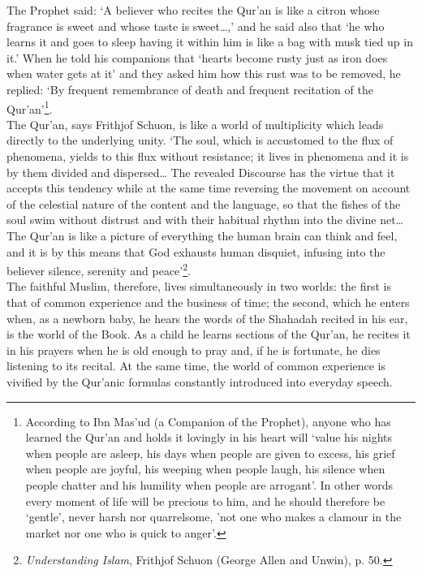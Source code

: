 \documentclass[10pt, twoside]{book}
\begin{document}
The Prophet said: `A believer who recites the Qur'an is like a citron whose fragrance is sweet and 
whose taste is sweet\ldots{},' and he said also that `he who learns it and goes to sleep having it within 
him is like a bag with musk tied up in it.' When he told his companions that `hearts become rusty 
just as iron does when water gets at it' and they asked him how this rust was to be removed, he 
replied: `By frequent remembrance of death and frequent recitation of the Qur'an'\footnote{According to Ibn Mas'ud (a Companion of the Prophet), anyone who has learned the Qur'an and holds 
it lovingly in his heart will `value his nights when people are asleep, his days when people are 
given to excess, his grief when people are joyful, his weeping when people laugh, his silence when 
people chatter and his humility when people are arrogant'. In other words every moment of life will 
be precious to him, and he should therefore be `gentle', never harsh nor quarrelsome, 'not one who 
makes a clamour in the market nor one who is quick to anger'.}.\\

The Qur'an, says Frithjof Schuon, is like a world of multiplicity which leads directly to the 
underlying unity. `The soul, which is accustomed to the flux of phenomena, yields to this flux 
without resistance; it lives in phenomena and it is by them divided and dispersed\ldots{} The revealed 
Discourse has the virtue that it accepts this tendency while at the same time reversing the movement 
on account of the celestial nature of the content and the language, so that the fishes of the soul 
swim without distrust and with their habitual rhythm into the divine net\ldots{} The Qur'an is like a 
picture of everything the human brain can think and feel, and it is by this means that God exhausts 
human disquiet, infusing into the believer silence, serenity and peace'\footnote{\emph{Understanding Islam}, Frithjof Schuon (George Allen and Unwin), p. 50.}.\\

The faithful Muslim, therefore, lives simultaneously in two worlds: the first is that of common 
experience and the business of time; the second, which he enters when, as a newborn baby, he hears 
the words of the Shahadah recited in his ear, is the world of the Book. As a child he learns sections 
of the Qur'an, he recites it in his prayers when he is old enough to pray and, if he is fortunate, he 
dies listening to its recital. At the same time, the world of common experience is vivified by the 
Qur'anic formulas constantly introduced into everyday speech. \\
\end{document}
